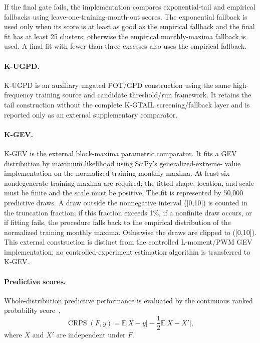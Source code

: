 \documentclass[AMA,Times1COL]{WileyNJDv5}
\begin{document}
If the final gate fails, the implementation compares exponential-tail
and empirical fallbacks using leave-one-training-month-out scores. The
exponential fallback is used only when its score is at least as good as
the empirical fallback and the final fit has at least 25 clusters;
otherwise the empirical monthly-maxima fallback is used. A final fit
with fewer than three excesses also uses the empirical fallback.

\paragraph*{K-UGPD.}

K-UGPD is an auxiliary ungated POT/GPD construction using the same
high-frequency training source and candidate threshold/run framework.
It retains the tail construction without the complete K-GTAIL
screening/fallback layer and is reported only as an external
supplementary comparator.

\paragraph*{K-GEV.}

K-GEV is the external block-maxima parametric comparator. It fits a GEV
distribution by maximum likelihood using SciPy's generalized-extreme-
value implementation on the normalized training monthly maxima. At
least six nondegenerate training maxima are required; the fitted shape,
location, and scale must be finite and the scale must be positive. The
fit is represented by 50,000 predictive draws. A draw outside the
nonnegative interval ([0,10]) is counted in the truncation fraction;
if this fraction exceeds 1\%, if a nonfinite draw occurs, or if fitting
fails, the procedure falls back to the empirical distribution of the
normalized training monthly maxima. Otherwise the draws are clipped to
([0,10]). This external construction is distinct from the controlled
L-moment/PWM GEV implementation; no controlled-experiment estimation
algorithm is transferred to K-GEV.

\paragraph*{Predictive scores.}

Whole-distribution predictive performance is evaluated by the
continuous ranked probability score~\cite{GneitingRaftery2007},
\[
\operatorname{CRPS}(F,y)
=
\mathbb E|X-y|
-
\frac12\mathbb E|X-X'|,
\]
where \(X\) and \(X'\) are independent under \(F\).
\end{document}
